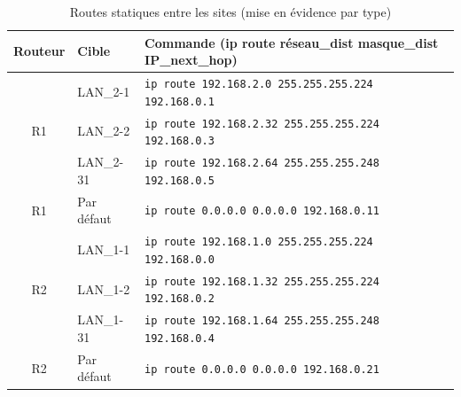 \documentclass[12pt,a4paper, oneside]{memoir}
\begin{document}
\begin{table}[H]
	\centering
	\begin{tabular}{|c|l|l|}
		\hline
		\rowcolor{gray!20}
		\textbf{Routeur} & Cible & \textbf{Commande} (ip route réseau_dist masque_dist IP_next_hop) \\
		\hline
		
		\rowcolor{blue!5}
		  & LAN\_2-1 & \texttt{ip route 192.168.2.0 255.255.255.224 192.168.0.1}  \\
		
		\rowcolor{blue!5}
		R1  & LAN\_2-2 &\texttt{ip route 192.168.2.32 255.255.255.224 192.168.0.3}  \\
		
		\rowcolor{blue!5}
		  & LAN\_2-31 &\texttt{ip route 192.168.2.64 255.255.255.248 192.168.0.5}  \\
			
		\rowcolor{green!10}
		R1 & Par défaut & \texttt{ip route 0.0.0.0 0.0.0.0 192.168.0.11} \\
		
		\hline
		\hline
		
		\rowcolor{orange!5}
		 & LAN\_1-1  & \texttt{ip route 192.168.1.0 255.255.255.224 192.168.0.0} 
		\\
		
		\rowcolor{orange!5}
		R2  & LAN\_1-2 & \texttt{ip route 192.168.1.32 255.255.255.224 192.168.0.2} 
		 \\
		
		\rowcolor{orange!5}
		  & LAN\_1-31 & \texttt{ip route 192.168.1.64 255.255.255.248 192.168.0.4} 
		 \\
		
		\rowcolor{green!10}
		R2 & Par défaut & \texttt{ip route 0.0.0.0 0.0.0.0 192.168.0.21} 
		\\
		
		\hline
	\end{tabular}
	\caption{Routes statiques entre les sites (mise en évidence par type)}
\end{table}

\end{document}
